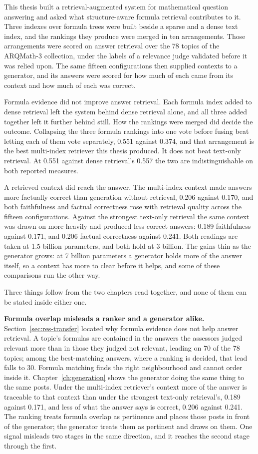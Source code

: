 This thesis built a retrieval-augmented system for mathematical question answering and asked what
structure-aware formula retrieval contributes to it. Three indexes over formula trees were built
beside a sparse and a dense text index, and the rankings they produce were merged in ten
arrangements. Those arrangements were scored on answer retrieval over the 78 topics of the ARQMath-3
collection, under the labels of a relevance judge validated before it was relied upon. The same
fifteen configurations then supplied contexts to a generator, and its answers were scored for how
much of each came from its context and how much of each was correct.

Formula evidence did not improve answer retrieval. Each formula index added to dense retrieval left
the system behind dense retrieval alone, and all three added together left it further behind still.
How the rankings were merged did decide the outcome. Collapsing the three formula rankings into one
vote before fusing beat letting each of them vote separately, 0.551 against 0.374, and that
arrangement is the best multi-index retriever this thesis produced. It does not beat text-only
retrieval. At 0.551 against dense retrieval's 0.557 the two are indistinguishable on both reported
measures.

A retrieved context did reach the answer. The multi-index context made answers more factually
correct than generation without retrieval, 0.206 against 0.170, and both faithfulness and factual
correctness rose with retrieval quality across the fifteen configurations. Against the strongest
text-only retrieval the same context was drawn on more heavily and produced less correct answers:
0.189 faithfulness against 0.171, and 0.206 factual correctness against 0.241. Both readings are
taken at 1.5 billion parameters, and both hold at 3 billion. The gains thin as the generator grows:
at 7 billion parameters a generator holds more of the answer itself, so a context has more to clear
before it helps, and some of these comparisons run the other way.

Three things follow from the two chapters read together, and none of them can be stated inside
either one.

\textbf{Formula overlap misleads a ranker and a generator alike.}
Section~\ref{sec:res-transfer} located why formula evidence does not help answer retrieval. A
topic's formulas are contained in the answers the assessors judged relevant more than in those they
judged not relevant, leading on 70 of the 78 topics; among the best-matching answers, where a
ranking is decided, that lead falls to 30. Formula matching finds the right neighbourhood and
cannot order inside it. Chapter~\ref{ch:generation} shows the generator doing the same thing to the
same posts. Under the multi-index retriever's context more of the answer is traceable to that
context than under the strongest text-only retrieval's, 0.189 against 0.171, and less of what the
answer says is correct, 0.206 against 0.241. The ranking treats formula overlap as pertinence and
places those posts in front of the generator; the generator treats them as pertinent and draws on
them. One signal misleads two stages in the same direction, and it reaches the second stage through
the first.

